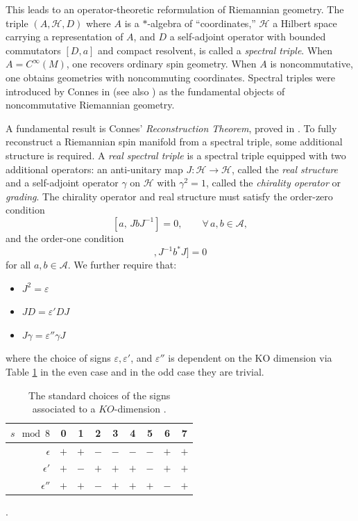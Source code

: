 \documentclass[11pt]{article}
\theoremstyle{plain}
\begin{document}
This leads to an operator-theoretic reformulation of Riemannian geometry.  The triple $(A,\mathcal{H},D)$
where $A$ is a $*$-algebra of ``coordinates,'' $\mathcal{H}$ a Hilbert space carrying a
representation of $A$, and $D$ a self-adjoint operator with bounded commutators $[D,a]$ and compact
resolvent, is called a \emph{spectral triple}.  When $A=C^{\infty}(M)$, one recovers ordinary spin
geometry.  When $A$ is noncommutative, one obtains geometries with noncommuting coordinates. Spectral triples were introduced by Connes in \cite{NCG and Reality} (see also
\cite{QFTNCG}) as the fundamental objects of noncommutative Riemannian geometry.



A fundamental result is Connes’ \emph{Reconstruction Theorem}, proved in \cite{ConnesRecon}. To fully reconstruct a Riemannian spin manifold from a spectral triple, some additional structure is required. 
A \emph{real spectral triple} is a spectral triple equipped with two additional operators: an anti-unitary map  $J:\mathcal{H}\to\mathcal{H}$, called the \textit{real structure} and a self-adjoint operator $\gamma$ on $\mathcal{H}$ with $\gamma^2=1$, called the \emph{chirality operator} or
\emph{grading}. The chirality operator and real structure must satisfy the order-zero condition  
\[
[a,\, J b J^{-1}] = 0, \qquad \forall\, a,b\in\mathcal{A},
\]
and the order-one condition
\begin{equation*}
	[[D,a],J^{-1}b^{*}J]=0
\end{equation*}
for all $a,b \in \mathcal{A}$. We further require that: 
\begin{itemize}
	\item $J^2 = \varepsilon$
	\item $JD = \varepsilon' DJ$
	\item $J\gamma = \varepsilon'' \gamma J$
\end{itemize}
where the choice of signs $\varepsilon,\varepsilon'$, and $\varepsilon''$ is dependent on the KO dimension via Table \ref{tab:KO_dimension} in the even case and in the odd case they are trivial. 
\begin{table}[h]
	\centering
	\begin{tabular}{r | c c c c c c c c}
		$s \mod 8$ 		& 0 & 1 & 2 & 3 & 4 & 5 & 6 & 7 \\
		\hline
		$\epsilon$		& $+$ & $+$ & $-$ & $-$ & $-$ & $-$ & $+$ & $+$ \\
		$\epsilon'$		& $+$ & $-$ & $+$ & $+$ & $+$ & $-$ & $+$ & $+$ \\
		$\epsilon''$	& $+$ & $+$ & $-$ & $+$ & $+$ & $+$ & $-$ & $+$
	\end{tabular}
	\caption{The standard choices of the signs associated to a $KO$-dimension  \cite{Connes95}.}. 
	\label{tab:KO_dimension}
\end{table}
\end{document}
